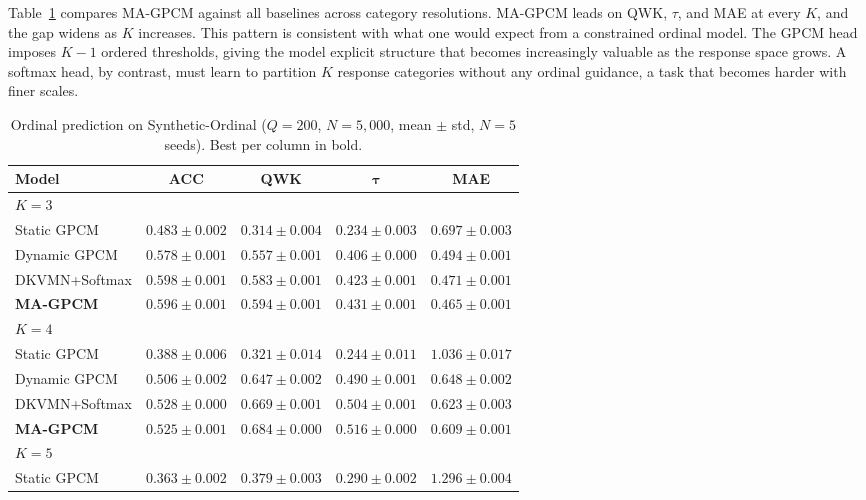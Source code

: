 \documentclass[pdflatex,sn-apa]{sn-jnl}
\begin{document}
Table~\ref{tab:comp_results} compares MA-GPCM against all baselines across category resolutions. MA-GPCM leads on QWK, $\tau$, and MAE at every $K$, and the gap widens as $K$ increases. This pattern is consistent with what one would expect from a constrained ordinal model. The GPCM head imposes $K{-}1$ ordered thresholds, giving the model explicit structure that becomes increasingly valuable as the response space grows. A softmax head, by contrast, must learn to partition $K$ response categories without any ordinal guidance, a task that becomes harder with finer scales.

\begin{table}[htb!]
\centering
\caption{Ordinal prediction on Synthetic-Ordinal ($Q=200$, $N=5{,}000$, mean $\pm$ std, $N\!=\!5$ seeds). Best per column in bold.}
\label{tab:comp_results}
\setlength{\tabcolsep}{3pt}
\begin{tabular}{lcccc}
\toprule
\textbf{Model} & \textbf{ACC} & \textbf{QWK} & $\boldsymbol{\tau}$ & \textbf{MAE} \\
\midrule
\multicolumn{5}{l}{$K=3$} \\
\cmidrule(lr){1-5}
Static GPCM    & $0.483 \pm 0.002$ & $0.314 \pm 0.004$ & $0.234 \pm 0.003$ & $0.697 \pm 0.003$ \\
Dynamic GPCM   & $0.578 \pm 0.001$ & $0.557 \pm 0.001$ & $0.406 \pm 0.000$ & $0.494 \pm 0.001$ \\
DKVMN+Softmax  & $\mathbf{0.598} \pm 0.001$ & $0.583 \pm 0.001$ & $0.423 \pm 0.001$ & $0.471 \pm 0.001$ \\
\textbf{MA-GPCM} & $0.596 \pm 0.001$ & $\mathbf{0.594} \pm 0.001$ & $\mathbf{0.431} \pm 0.001$ & $\mathbf{0.465} \pm 0.001$ \\
\midrule
\multicolumn{5}{l}{$K=4$} \\
\cmidrule(lr){1-5}
Static GPCM    & $0.388 \pm 0.006$ & $0.321 \pm 0.014$ & $0.244 \pm 0.011$ & $1.036 \pm 0.017$ \\
Dynamic GPCM   & $0.506 \pm 0.002$ & $0.647 \pm 0.002$ & $0.490 \pm 0.001$ & $0.648 \pm 0.002$ \\
DKVMN+Softmax  & $\mathbf{0.528} \pm 0.000$ & $0.669 \pm 0.001$ & $0.504 \pm 0.001$ & $0.623 \pm 0.003$ \\
\textbf{MA-GPCM} & $0.525 \pm 0.001$ & $\mathbf{0.684} \pm 0.000$ & $\mathbf{0.516} \pm 0.000$ & $\mathbf{0.609} \pm 0.001$ \\
\midrule
\multicolumn{5}{l}{$K=5$} \\
\cmidrule(lr){1-5}
Static GPCM    & $0.363 \pm 0.002$ & $0.379 \pm 0.003$ & $0.290 \pm 0.002$ & $1.296 \pm 0.004$ \\

\end{tabular}
\end{table}
\end{document}
